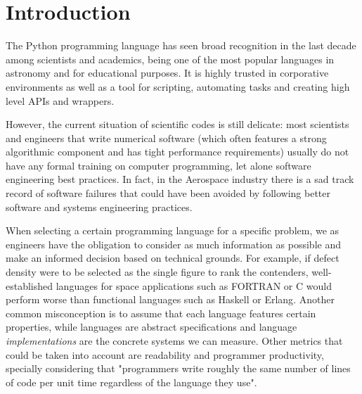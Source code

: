 \section{Introduction}
\label{sec:intro}

The Python programming language has seen broad recognition in the last decade among scientists and academics, being one of the most popular languages in astronomy\citep{Robitaille2013} and for educational purposes\citep{guo2014python}. It is highly trusted in corporative environments as well as a tool for scripting, automating tasks and creating high level APIs and wrappers.

However, the current situation of scientific codes is still delicate: most scientists and engineers that write numerical software (which often features a strong algorithmic component and has tight performance requirements) usually do not have any formal training on computer programming, let alone software engineering best practices\citep{Wilson2014}. In fact, in the Aerospace industry there is a sad track record of software failures\citep{albee2000report,lions1996report} that could have been avoided by following better software and systems engineering practices.

When selecting a certain programming language for a specific problem, we as engineers have the obligation to consider as much information as possible and make an informed decision based on technical grounds. For example, if defect density were to be selected as the single figure to rank the contenders, well-established languages for space applications such as FORTRAN or C would perform worse than functional languages such as Haskell or Erlang\citep{Ray2014}. Another common misconception is to assume that each language features certain properties, while languages are abstract specifications and language \textit{implementations} are the concrete systems we can measure. Other metrics that could be taken into account are readability and programmer productivity, specially considering that "programmers write roughly the same number of lines of code per unit time regardless of the language they use"\citep{Wilson2014}.


